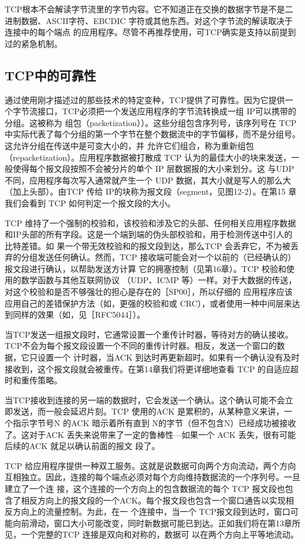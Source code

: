 TCP根本不会解读字节流里的字节内容。它不知道正在交换的数据字节是不是二进制数据、ASCII字符、EBCDIC 字符或其他东西。对这个字节流的解读取决于连接中的每个端点
的应用程序。尽管不再推荐使用，可TCP确实是支持以前提到过的紧急机制。
\subsection{TCP中的可靠性}
通过使用刚才描述过的那些技术的特定变种，TCP提供了可靠性。因为它提供一个字节流接口，TCP必须把一个发送应用程序的字节流转换成一组 IP可以携带的分组。这被称为
组包（packetization））。这些分组包含序列号，该序列号在 TCP 中实际代表了每个分组的第一个字节在整个数据流中的字节偏移，而不是分组号。这允许分组在传送中是可变大小的，并
允许它们组合，称为重新组包（repacketization）。应用程序数据被打散成 TCP 认为的最佳大小的块来发送，一般使得每个报文段按照不会被分片的单个 IP 层数据报的大小来划分。这
与UDP 不同，应用程序每次写入通常就产生一个 UDP 数据，其大小就是写人的那么大（加上头部）。由TCP 传给 IP的块称为报文段（segment，见图12-2）。在第15 章我们会看到
TCP 如何判定一个报文段的大小。

TCP 维持了一个强制的校验和，该校验和涉及它的头部、任何相关应用程序数据和IP头部的所有字段。这是一个端到端的伪头部校验和，用于检测传送中引人的比特差错。如
果一个带无效校验和的报文段到达，那么TCP 会丢弃它，不为被丢弃的分组发送任何确认。然而，TCP 接收端可能会对一个以前的（已经确认的）报文段进行确认，以帮助发送方计算
它的拥塞控制（见第16章）。TCP 校验和使用的数学函数与其他互联网协议 （UDP、ICMP 等）一样。对于大数据的传送，对这个校验和是否不够强壮的担心是存在的［SP00］，所以仔细的
应用程序应该应用自己的差错保护方法（如，更强的校验和或 CRC），或者使用一种中间层来达到同样的效果（如，见［RFC5044］）。

当TCP发送一组报文段时，它通常设置一个重传计时器，等待对方的确认接收。TCP不会为每个报文段设置一个不同的重传计时器。相反，发送一个窗口的数据，它只设置一个
计时器，当ACK 到达时再更新超时。如果有一个确认没有及时接收到，这个报文段就会被重传。在第14章我们将更详细地查看 TCP 的自适应超时和重传策略。

当TCP接收到连接的另一端的数据时，它会发送一个确认。这个确认可能不会立即发送，而一般会延迟片刻。TCP 使用的ACK 是累积的，从某种意义来讲，一个指示字节号N
的ACK 暗示着所有直到 N的字节（但不包含N）已经成功被接收了。这对于ACK 丢失来说带来了一定的鲁棒性—如果一个 ACK 丢失，很有可能后续的ACK 就足以确认前面的报文
段了。

TCP 给应用程序提供一种双工服务。这就是说数据可向两个方向流动，两个方向互相独立。因此，连接的每个端点必须对每个方向维持数据流的一个序列号。一旦建立了一个连
接，这个连接的一个方向上的包含数据流的每个 TCP 报文段也包含了相反方向上的报文段的一个ACK。每个报文段也包含一个窗口通告以实现相反方向上的流量控制。为此，在一
个连接中，当一个 TCP报文段到达时，窗口可能向前滑动，窗口大小可能改变，同时新数据可能已到达。正如我们将在第13章所见，一个完整的TCP 连接是双向和对称的，数据可
以在两个方向上平等地流动。

